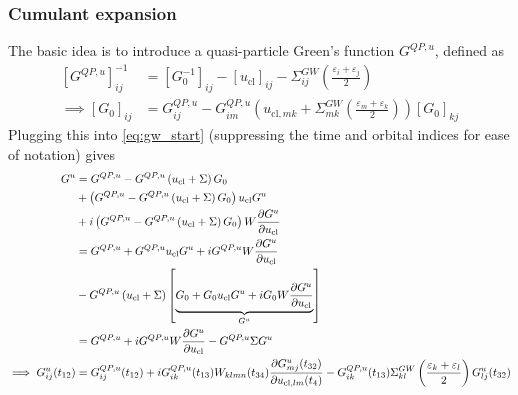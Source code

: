 \subsubsection{Cumulant expansion}
The basic idea is to introduce a quasi-particle Green's function $G^{Q P, u}$, defined as
\begin{align}
\left[G^{Q P, u}\right]_{i j}^{-1}&=\left[G_{0}^{-1}\right]_{i j}-\left[u_{\mathrm{cl}}\right]_{i j}-\Sigma_{i j}^{G W}\left(\frac{\varepsilon_{i}+\varepsilon_{j}}{2}\right)\\
 \implies \left[G_0\right]_{ij} &= G^{Q P, u}_{i j} - G^{Q P, u}_{i m} \left( u_{\mathrm{cl}, m k} + \Sigma_{m k}^{G W}\left(\frac{\varepsilon_{m}+\varepsilon_{k}}{2}\right) \right) \left[ G_0\right]_{kj}
\end{align}
Plugging this into \ref{eq:gw_start} (suppressing the time and orbital indices for ease of notation) gives
\begin{align}
G^{u}&= G^{Q P, u} - G^{Q P, u} \left( u_{\mathrm{cl}} +  \Sigma  \right) G_0 \notag \\
& + \left(G^{Q P, u} - G^{Q P, u} \left( u_{\mathrm{cl}} +  \Sigma \right) G_0\right) u_{\mathrm{cl}} G^{u} \notag \\
& + i \left(G^{Q P, u} - G^{Q P, u} \left( u_{\mathrm{cl}} +  \Sigma \right) G_0\right) W \frac{\partial G^{u}}{\partial u_{\mathrm{cl}}} \\
&= G^{Q P, u} + G^{Q P, u} u_{\mathrm{cl}} G^{u} + i G^{Q P, u} W \frac{\partial G^{u}}{\partial u_{\mathrm{cl}}} \notag \\
& - G^{Q P, u} \left( u_{\mathrm{cl}} +  \Sigma \right) \left[ \underbrace{G_0 + G_0 u_{\mathrm{cl}} G^{u} + i G_0 W \frac{\partial G^{u}}{\partial u_{\mathrm{cl}}}}_{G^{u}} \right] \notag \\
&= G^{Q P, u} + i G^{Q P, u} W \frac{\partial G^{u}}{\partial u_{\mathrm{cl}}} - G^{Q P, u}  \Sigma  G^{u} \\
\implies G^{u}_{ij}(t_{12}) &= G^{Q P, u}_{ij}(t_{12}) + i G^{Q P, u}_{ik}(t_{13}) W_{klmn}(t_{34}) \frac{\partial G^{u}_{mj}(t_{32})}{\partial u_{\mathrm{cl}, lm}(t_4)} - G^{Q P, u}_{ik}(t_{13}) \Sigma^{GW}_{kl}\left(\frac{\varepsilon_k + \varepsilon_l}{2}\right) G^{u}_{lj}(t_{32})
\end{align}
